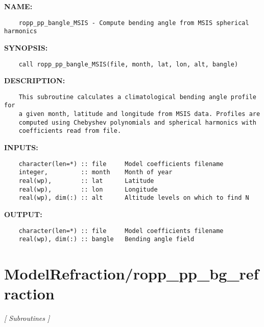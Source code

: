 \label{ch:robo34}
\label{ch:ModelRefraction_ropp_pp_bangle_MSIS}
\textbf{NAME:}\hspace{0.08in}\begin{Verbatim}
    ropp_pp_bangle_MSIS - Compute bending angle from MSIS spherical harmonics
\end{Verbatim}
\textbf{SYNOPSIS:}\hspace{0.08in}\begin{Verbatim}
    call ropp_pp_bangle_MSIS(file, month, lat, lon, alt, bangle)
\end{Verbatim}
\textbf{DESCRIPTION:}\hspace{0.08in}\begin{Verbatim}
    This subroutine calculates a climatological bending angle profile for 
    a given month, latitude and longitude from MSIS data. Profiles are 
    computed using Chebyshev polynomials and spherical harmonics with 
    coefficients read from file.
\end{Verbatim}
\textbf{INPUTS:}\hspace{0.08in}\begin{Verbatim}
    character(len=*) :: file     Model coefficients filename
    integer,         :: month    Month of year
    real(wp),        :: lat      Latitude
    real(wp),        :: lon      Longitude
    real(wp), dim(:) :: alt      Altitude levels on which to find N
\end{Verbatim}
\textbf{OUTPUT:}\hspace{0.08in}\begin{Verbatim}
    character(len=*) :: file     Model coefficients filename
    real(wp), dim(:) :: bangle   Bending angle field
\end{Verbatim}
\section{ModelRefraction/ropp\_pp\_bg\_refraction}
\textsl{[ Subroutines ]}

